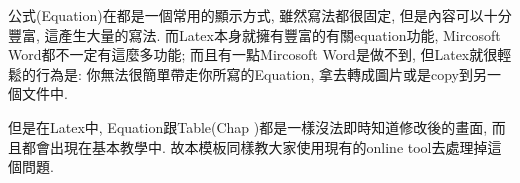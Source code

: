 


公式(Equation)在都是一個常用的顯示方式, 雖然寫法都很固定, 但是內容可以十分豐富, 這產生大量的寫法. 而Latex本身就擁有豐富的有關equation功能, Mircosoft Word都不一定有這麼多功能; 而且有一點Mircosoft Word是做不到, 但Latex就很輕鬆的行為是: 你無法很簡單帶走你所寫的Equation, 拿去轉成圖片或是copy到另一個文件中.

但是在Latex中, Equation跟Table(Chap )都是一樣沒法即時知道修改後的畫面, 而且都會出現在基本教學中. 故本模板同樣教大家使用現有的online tool去處理掉這個問題.

